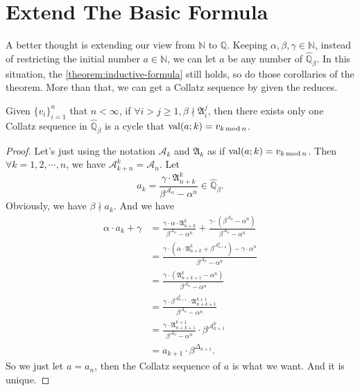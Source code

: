 \section{Extend The Basic Formula}\label{sec:extend-the-basic-formula}

A better thought is extending our view from $\mathbb{N}$ to $\mathbb{Q}$.
Keeping $\alpha, \beta, \gamma \in \mathbb{N}$, instead of restricting the initial number $a \in \mathbb{N}$, we can let $a$ be any number of $\widehat{\mathbb{Q}}_{{\beta}}$.
In this situation, the \cref{theorem:inductive-formula} still holds, so do those corollaries of the theorem.
More than that, we can get a Collatz sequence by given the reduces.

\begin{theorem}\label{theorem:any-cycle}
    Given $\{v_{i}\}_{i=1}^{n}$ that $n < \infty$, if $\forall i>j\ge1, \beta \nmid \mathfrak{A}_i^{j}$, then there exists only one Collatz sequence in $\widehat{\mathbb{Q}}_{{\beta}}$ is a cycle that $\operatorname{val}(a;k) = v_{k\operatorname{mod} n}$.
\end{theorem}
\begin{proof}%
    Let's just using the notation $\mathcal{A}_k$ and $\mathfrak{A}_k$ as if $\operatorname{val}(a;k) = v_{k\operatorname{mod} n}$.\newline
    Then $\forall k = 1, 2, \cdots, n$, we have $\mathcal{A}_{k + n}^{k} = \mathcal{A}_n$.
    Let
    \[ a_k = \frac{\gamma\cdot\mathfrak{A}_{n+k}^{k}}{\beta^{\mathcal{A}_n} - \alpha^n} \in \widehat{\mathbb{Q}}_{{\beta}}. \]
    Obviously, we have $\beta \nmid a_{k}$.
    And we have
    \begin{align*}
        \alpha\cdot a_{k} + \gamma &= \frac{\gamma\cdot\alpha\cdot\mathfrak{A}_{n+k}^{k}}{\beta^{\mathcal{A}_n} - \alpha^n} + \frac{\gamma\cdot(\beta^{\mathcal{A}_n} - \alpha^n)}{\beta^{\mathcal{A}_n} - \alpha^n} \\
        &= \frac{\gamma\cdot(\alpha\cdot\mathfrak{A}_{n+k}^{k}+\beta^{\mathcal{A}_{n+k}^{k}}) - \gamma\cdot\alpha^n}{\beta^{\mathcal{A}_n} - \alpha^n} \\
        &= \frac{\gamma\cdot(\mathfrak{A}_{n+k+1}^{k} - \alpha^{n})}{\beta^{\mathcal{A}_n} - \alpha^n} \\
        &= \frac{\gamma\cdot\beta^{\mathcal{A}_{k+1}^{k}}\cdot\mathfrak{A}_{n+k+1}^{k+1}}{\beta^{\mathcal{A}_n} - \alpha^n} \\
        &= \frac{\gamma\cdot\mathfrak{A}_{n+k+1}^{k+1}}{\beta^{\mathcal{A}_n} - \alpha^n}\cdot \beta^{\mathcal{A}_{k+1}^{k}} \\
        &= a_{k+1}\cdot \beta^{\Delta_{k+1}}.
    \end{align*}
    So we just let $a = a_{n}$, then the Collatz sequence of $a$ is what we want.
    And it is unique.
\end{proof}
